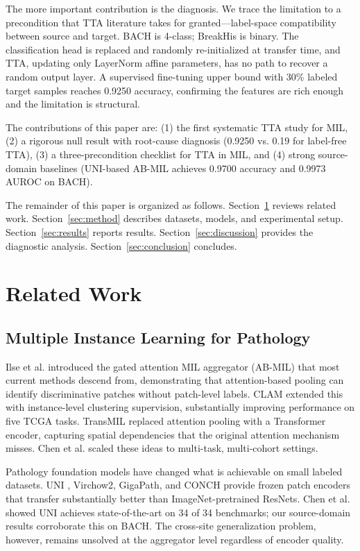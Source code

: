 \documentclass[conference]{IEEEtran}
\begin{document}
The more important contribution is the diagnosis. We trace the limitation to a precondition that TTA literature takes for granted---label-space compatibility between source and target. BACH is 4-class; BreakHis is binary. The classification head is replaced and randomly re-initialized at transfer time, and TTA, updating only LayerNorm affine parameters, has no path to recover a random output layer. A supervised fine-tuning upper bound with 30\% labeled target samples reaches 0.9250 accuracy, confirming the features are rich enough and the limitation is structural.

The contributions of this paper are: (1) the first systematic TTA study for MIL, (2) a rigorous null result with root-cause diagnosis (0.9250 vs. 0.19 for label-free TTA), (3) a three-precondition checklist for TTA in MIL, and (4) strong source-domain baselines (UNI-based AB-MIL achieves 0.9700 accuracy and 0.9973 AUROC on BACH).

The remainder of this paper is organized as follows. Section~\ref{sec:related} reviews related work. Section~\ref{sec:method} describes datasets, models, and experimental setup. Section~\ref{sec:results} reports results. Section~\ref{sec:discussion} provides the diagnostic analysis. Section~\ref{sec:conclusion} concludes.

\section{Related Work}
\label{sec:related}

\subsection{Multiple Instance Learning for Pathology}

Ilse et al. \cite{ilse2018attention} introduced the gated attention MIL aggregator (AB-MIL) that most current methods descend from, demonstrating that attention-based pooling can identify discriminative patches without patch-level labels. CLAM \cite{lu2021data} extended this with instance-level clustering supervision, substantially improving performance on five TCGA tasks. TransMIL \cite{shao2021transmil} replaced attention pooling with a Transformer encoder, capturing spatial dependencies that the original attention mechanism misses. Chen et al. \cite{chen2022scaling} scaled these ideas to multi-task, multi-cohort settings.

Pathology foundation models have changed what is achievable on small labeled datasets. UNI \cite{chen2024uni}, Virchow2, GigaPath, and CONCH provide frozen patch encoders that transfer substantially better than ImageNet-pretrained ResNets. Chen et al. \cite{chen2024uni} showed UNI achieves state-of-the-art on 34 of 34 benchmarks; our source-domain results corroborate this on BACH. The cross-site generalization problem, however, remains unsolved at the aggregator level regardless of encoder quality.
\end{document}
